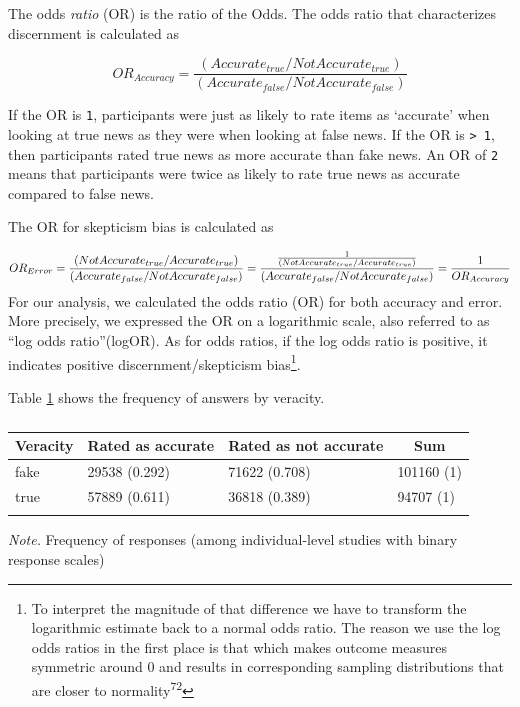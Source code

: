 \documentclass[
  man]{apa6}
\begin{document}
The odds \emph{ratio} (OR) is the ratio of the Odds. The odds ratio that characterizes discernment is calculated as

\[
OR_{Accuracy} = \frac{(Accurate_{true}/ NotAccurate_{true})}{(Accurate_{false}/ NotAccurate_{false})}
\]

If the OR is \texttt{1}, participants were just as likely to rate items as `accurate' when looking at true news as they were when looking at false news. If the OR is \texttt{\textgreater{}\ 1}, then participants rated true news as more accurate than fake news. An OR of \texttt{2} means that participants were twice as likely to rate true news as accurate compared to false news.

The OR for skepticism bias is calculated as

\[
OR_{Error} = \frac{(NotAccurate_{true}/Accurate_{true})}{(Accurate_{false}/NotAccurate_{false})} \leavevmode \newline
= \frac{\frac{1}{(NotAccurate_{true}/Accurate_{true})}}{(Accurate_{false}/NotAccurate_{false})} \leavevmode \newline
= \frac{1}{OR_{Accuracy}}
\]
For our analysis, we calculated the odds ratio (OR) for both accuracy and error. More precisely, we expressed the OR on a logarithmic scale, also referred to as ``log odds ratio''(logOR). As for odds ratios, if the log odds ratio is positive, it indicates positive discernment/skepticism bias\footnote{To interpret the magnitude of that difference we have to transform the logarithmic estimate back to a normal odds ratio. The reason we use the log odds ratios in the first place is that which makes outcome measures symmetric around 0 and results in corresponding sampling distributions that are closer to normality\textsuperscript{72}}.

Table \ref{tab:frequency} shows the frequency of answers by veracity.

\begin{table}[tbp]

\begin{center}
\begin{threeparttable}

\caption{\label{tab:frequency}}

\begin{tabular}{llll}
\toprule
Veracity & \multicolumn{1}{c}{Rated as accurate} & \multicolumn{1}{c}{Rated as not accurate} & \multicolumn{1}{c}{Sum}\\
\midrule
fake & 29538 (0.292) & 71622 (0.708) & 101160 (1)\\
true & 57889 (0.611) & 36818 (0.389) & 94707 (1)\\
\bottomrule
\addlinespace
\end{tabular}

\begin{tablenotes}[para]
\normalsize{\textit{Note.} Frequency of responses (among individual-level studies with binary response scales)}
\end{tablenotes}

\end{threeparttable}
\end{center}

\end{table}
\end{document}

